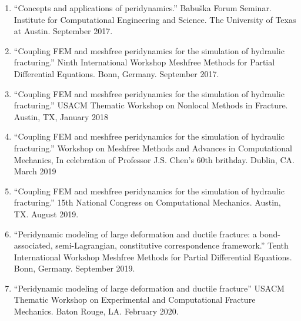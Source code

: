 \begin{enumerate}[resume]
    \item ``Concepts and applications of peridynamics.'' Babu\v{s}ka Forum Seminar. Institute for Computational Engineering and Science. The University of Texas at Austin. September 2017.
    \item ``Coupling FEM and meshfree peridynamics for the simulation of hydraulic fracturing.'' Ninth International Workshop Meshfree Methods for Partial Differential Equations. Bonn, Germany. September 2017.
    \item ``Coupling FEM and meshfree peridynamics for the simulation of hydraulic fracturing.'' USACM Thematic Workshop on Nonlocal Methods in Fracture.  Austin, TX, January 2018
    \item ``Coupling FEM and meshfree peridynamics for the simulation of hydraulic fracturing.'' Workshop on Meshfree Methods and Advances in Computational Mechanics, In celebration of Professor J.S. Chen's 60th brithday.  Dublin, CA.  March 2019
    \item ``Coupling FEM and meshfree peridynamics for the simulation of hydraulic fracturing.'' 15th National Congress on Computational Mechanics. Austin, TX. August 2019.
    \item ``Peridynamic modeling of large deformation and ductile fracture: a bond-associated, semi-Lagrangian, constitutive correspondence framework.'' Tenth International Workshop Meshfree Methods for Partial Differential Equations. Bonn, Germany. September 2019.
    \item ``Peridynamic modeling of large deformation and ductile fracture'' USACM Thematic Workshop on Experimental and Computational Fracture Mechanics. Baton Rouge, LA. February 2020.
\end{enumerate}
\else
%
\ifdefined\ispdf
